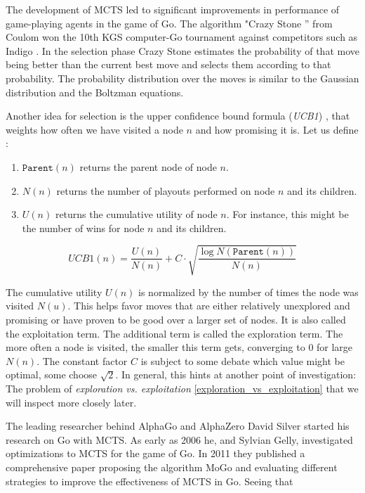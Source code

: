 The development of MCTS led to significant improvements in performance of game-playing agents in the game of Go. The algorithm "Crazy Stone '' from Coulom won the 10th KGS computer-Go tournament against competitors such as Indigo \cite{bouzy_associating_2006}. In the selection phase Crazy Stone estimates the probability of that move being better than the current best move and selects them according to that probability. The probability distribution over the moves is similar to the Gaussian distribution and the Boltzman equations. \cite[p. 4]{coulom_efficient_2007}

Another idea for selection is the upper confidence bound formula (\textit{UCB1}) \cite{auer_finite-time_nodate}, that weights how often we have visited a node $n$ and how promising it is. Let us define \cite[cf. p. 328]{russell_artificial_2021}:

\begin{enumerate}
    \item $\texttt{Parent}(n)$ returns the parent node of node $n$.
    \item $N(n) $ returns the number of playouts performed on node $n$ and its children.
    \item $U(n) $ returns the cumulative utility of node $n$. For instance, this might be the number of wins for node $n$ and its children.
\end{enumerate}

\begin{equation}
    \textit{UCB1}(n) = \frac{U(n)}{N(n)} + C \cdot \sqrt{\frac{\log{N(\texttt{Parent}(n))}}{N(n)}}
    \label{eq:UCB1}
\end{equation}

The cumulative utility $U(n)$ is normalized by the number of times the node was visited $N(u)$. This helps favor moves that are either relatively unexplored and promising or have proven to be good over a larger set of nodes. It is also called the exploitation term. The additional term is called the exploration term. The more often a node is visited, the smaller this term gets, converging to 0 for large $N(n)$. The constant factor $C$ is subject to some debate which value might be optimal, some choose $\sqrt{2}$. In general, this hints at another point of investigation: The problem of \textit{exploration vs. exploitation} \ref{exploration_vs_exploitation} that we will inspect more closely later.

The leading researcher behind AlphaGo and AlphaZero David Silver started his research on Go with MCTS. As early as 2006 he, and Sylvian Gelly, investigated optimizations to MCTS \cite{gelly_achieving_nodate} for the game of Go. In 2011 they published a comprehensive paper \cite{gelly_monte-carlo_2011} proposing the algorithm MoGo and evaluating different strategies to improve the effectiveness of MCTS in Go. Seeing that

